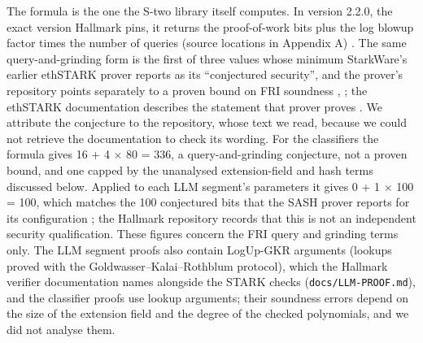 \documentclass[11pt]{article}
\begin{document}
The formula is the one the S-two library itself computes. In version 2.2.0, the exact version Hallmark pins, it returns the proof-of-work bits plus the log blowup factor times the number of queries (source locations in Appendix A) \cite{A28}. The same query-and-grinding form is the first of three values whose minimum StarkWare's earlier ethSTARK prover reports as its ``conjectured security'', and the prover's repository points separately to a proven bound on FRI soundness \cite{A39}, \cite{A40}; the ethSTARK documentation describes the statement that prover proves \cite{A43}. We attribute the conjecture to the repository, whose text we read, because we could not retrieve the documentation to check its wording. For the classifiers the formula gives 16 + 4 × 80 = 336, a query-and-grinding conjecture, not a proven bound, and one capped by the unanalysed extension-field and hash terms discussed below. Applied to each LLM segment's parameters it gives 0 + 1 × 100 = 100, which matches the 100 conjectured bits that the SASH prover reports for its configuration \cite{SASH}; the Hallmark repository records that this is not an independent security qualification. These figures concern the FRI query and grinding terms only. The LLM segment proofs also contain LogUp-GKR arguments (lookups proved with the Goldwasser--Kalai--Rothblum protocol), which the Hallmark verifier documentation names alongside the STARK checks (\texttt{docs/\allowbreak{}LLM-\allowbreak{}PROOF.\allowbreak{}md}), and the classifier proofs use lookup arguments; their soundness errors depend on the size of the extension field and the degree of the checked polynomials, and we did not analyse them.
\end{document}
